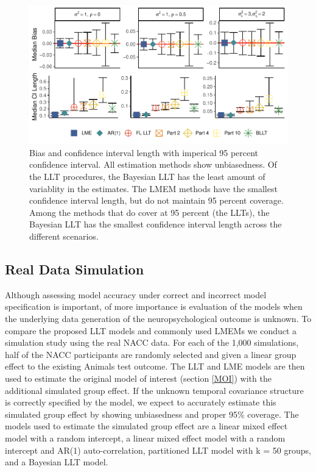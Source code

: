 \documentclass[
]{article}
\begin{document}
\begin{figure}
\centering
\includegraphics{Master_files/figure-latex/unnamed-chunk-15-1.pdf}
\caption{\label{fig:unnamed-chunk-15}Bias and confidence interval length with imperical 95 percent confidence interval. All estimation methods show unbiasedness. Of the LLT procedures, the Bayesian LLT has the least amount of variablity in the estimates. The LMEM methods have the smallest confidence interval length, but do not maintain 95 percent coverage. Among the methods that do cover at 95 percent (the LLTs), the Bayesian LLT has the smallest confidence interval length across the different scenarios.}
\end{figure}

\hypertarget{real-data-simulation}{%
\subsection{Real Data Simulation}\label{real-data-simulation}}

Although assessing model accuracy under correct and incorrect model specification is important, of more importance is evaluation of the models when the underlying data generation of the neuropsychological outcome is unknown. To compare the proposed LLT models and commonly used LMEMs we conduct a simulation study using the real NACC data. For each of the 1,000 simulations, half of the NACC participants are randomly selected and given a linear group effect to the existing Animals test outcome. The LLT and LME models are then used to estimate the original model of interest (section \ref{MOI}) with the additional simulated group effect. If the unknown temporal covariance structure is correctly specified by the model, we expect to accurately estimate this simulated group effect by showing unbiasedness and proper 95\% coverage. The models used to estimate the simulated group effect are a linear mixed effect model with a random intercept, a linear mixed effect model with a random intercept and AR(1) auto-correlation, partitioned LLT model with k = 50 groups, and a Bayesian LLT model.
\end{document}
